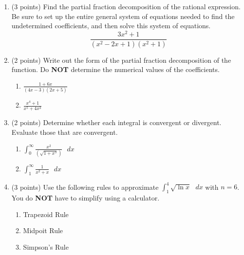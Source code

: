 \documentclass[paper=a4, fontsize=11pt]{scrartcl} %
\numberwithin{equation}{section} %
\numberwithin{figure}{section} %
\numberwithin{table}{section} %
\begin{document}
\begin{enumerate}
\item (3 points) Find the partial fraction decomposition of the rational expression.  Be sure to set up the entire general system of equations needed to find the undetermined coefficients, and then solve this system of equations.\\
\begin{equation*}
\frac{3x^2+1}{(x^2-2x+1)(x^2+1)}
\end{equation*}

\newpage

\item (2 points) Write out the form of the partial fraction decomposition of the function.  Do \textbf{NOT} determine the numerical values of the coefficients. 
\begin{enumerate}
\item \begin{large}$\frac{1+6x}{(4x-3)(2x+5)}$\end{large}
\vspace{1.5in}
\item \begin{large}$\frac{x^4+1}{x^5+4x^3}$\end{large}
\end{enumerate}

\vspace{1.5in}

\item (2 points) Determine whether each integral is convergent or divergent.  Evaluate those that are convergent.
\begin{enumerate}
\item \begin{large}$\int_0^\infty \frac{x^2}{(\sqrt{1+x^3})} \text { } dx$\end{large}
\vspace{1.5in}
\item \begin{large}$\int_1^\infty \frac{1}{x^2+x}\text { } dx$\end{large}
\end{enumerate}

\newpage

\item (3 points) Use the following rules to approximate $\int_1^4 \sqrt{\ln x} \text{ } dx$ with $n=6$.  You do \textbf{NOT} have to simplify using a calculator.\\
\begin{enumerate}
\item Trapezoid Rule
\vspace{2.5in}
\item Midpoit Rule
\vspace{2.5in}
\item Simpson's Rule
\end{enumerate}

\end{enumerate}

\end{document}

